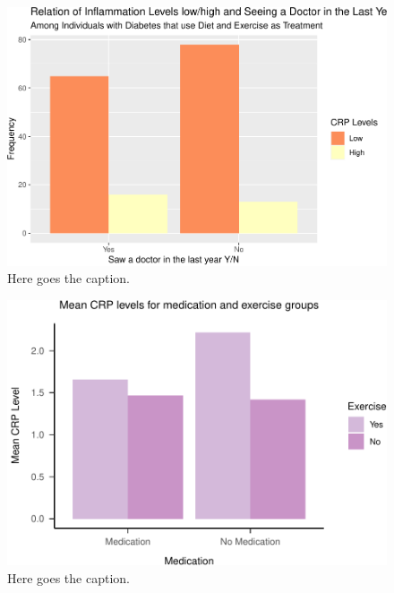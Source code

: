 \documentclass[
  man]{apa6}
\begin{document}
\begin{figure}
\centering
\includegraphics{NEW_Final_Groupof5_files/figure-latex/prop-access-bar-1.pdf}
\caption{\label{fig:prop-access-bar}Here goes the caption.}
\end{figure}



\begin{figure}
\centering
\includegraphics{NEW_Final_Groupof5_files/figure-latex/tableofcrpmedicationandexercise-1.pdf}
\caption{\label{fig:tableofcrpmedicationandexercise}Here goes the caption.}
\end{figure}
\end{document}
